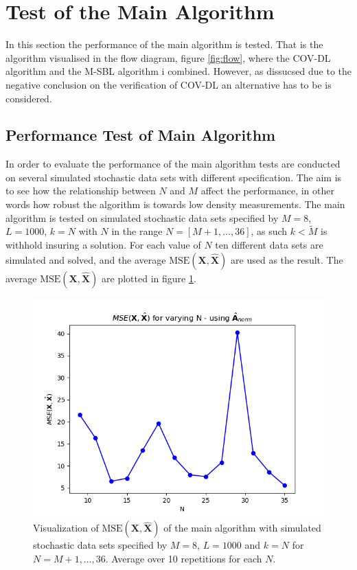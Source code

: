 \section{Test of the Main Algorithm}\label{sec:test_base}
In this section the performance of the main algorithm is tested. That is the algorithm visualised in the flow diagram, figure \ref{fig:flow}, where the COV-DL algorithm and the M-SBL algorithm i combined. However, as dissucsed due to the negative conclusion on the verification of COV-DL an alternative has to be is considered.  
 
  

\subsection{Performance Test of Main Algorithm}\label{sec:Main_test}
In order to evaluate the performance of the main algorithm tests are conducted on several simulated stochastic data sets with different specification. 
The aim is to see how the relationship between $N$ and $M$ affect the performance, in other words how robust the algorithm is towards low density measurements. 
The main algorithm is tested on simulated stochastic data sets specified by $M=8$, $L=1000$, $k=N$ with $N$ in the range $N = [M+1,\dots,36]$, as such $k<\widetilde{M}$ is withhold insuring a solution.
For each value of $N$ ten different data sets are simulated and solved, and the average $\text{MSE}(\mathbf{X}, \hat{\mathbf{X}})$ are used as the result. 
The average $\text{MSE}(\mathbf{X}, \hat{\mathbf{X}})$ are plotted in figure \ref{fig:varyN1}.
\begin{figure}[H]
    \centering
	\includegraphics[scale=0.5]{figures/ch_6/varyN1.png}
	\caption{Visualization of $\text{MSE}(\mathbf{X}, \hat{\mathbf{X}})$ of the main algorithm with simulated stochastic data sets specified by $M = 8$, $L=1000$ and $k = N$ for $N = M+1, \hdots , 36$. Average over 10 repetitions for each $N$.}
	\label{fig:varyN1}
\end{figure}

